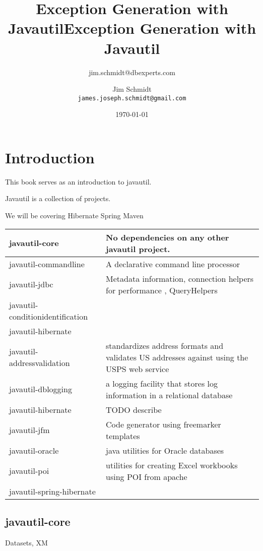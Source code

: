\documentclass[a4paper,10pt]{book}
\title{Exception Generation with Javautil}
\author{jim.schmidt@dbexperts.com}
\begin{document}
\title{Exception Generation with Javautil}
\author{Jim Schmidt\\
  \texttt{james.joseph.schmidt@gmail.com}}
\date{\today}
\maketitle
\tableofcontents
\chapter{Introduction}
This book serves as an introduction to javautil.

Javautil is a collection of projects.

We will be covering 
Hibernate
Spring 
Maven



\begin{tabular}{l | l}

javautil-core & No dependencies on any other javautil project. \\ \hline
javautil-commandline & A declarative command line processor \\ \hline
javautil-jdbc & Metadata information, connection helpers for performance , QueryHelpers \\ \hline

javautil-conditionidentification \\ \hline


javautil-hibernate & \\ \hline 
javautil-addressvalidation & standardizes address formats and validates US addresses against using the USPS web service \\ \hline 
javautil-dblogging & a logging facility that stores log information in a relational database \\ \hline
javautil-hibernate & TODO describe \\ \hline

javautil-jfm & Code generator using freemarker templates \\ \hline
javautil-oracle & java utilities for Oracle databases \\ \hline
javautil-poi & utilities for creating Excel workbooks using POI from apache \\ \hline
javautil-spring-hibernate & \\ 


\end{tabular} 

\section{javautil-core}
Datasets, XM
\end{document}
